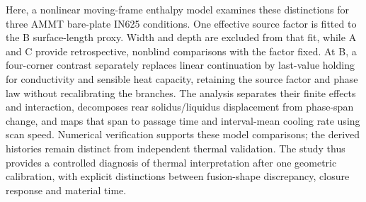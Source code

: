 Here, a nonlinear moving-frame enthalpy model examines these distinctions for three AMMT bare-plate IN625 conditions. One effective source factor is fitted to the B surface-length proxy. Width and depth are excluded from that fit, while A and C provide retrospective, nonblind comparisons with the factor fixed. At B, a four-corner contrast separately replaces linear continuation by last-value holding for conductivity and sensible heat capacity, retaining the source factor and phase law without recalibrating the branches. The analysis separates their finite effects and interaction, decomposes rear solidus/liquidus displacement from phase-span change, and maps that span to passage time and interval-mean cooling rate using scan speed. Numerical verification supports these model comparisons; the derived histories remain distinct from independent thermal validation. The study thus provides a controlled diagnosis of thermal interpretation after one geometric calibration, with explicit distinctions between fusion-shape discrepancy, closure response and material time.
